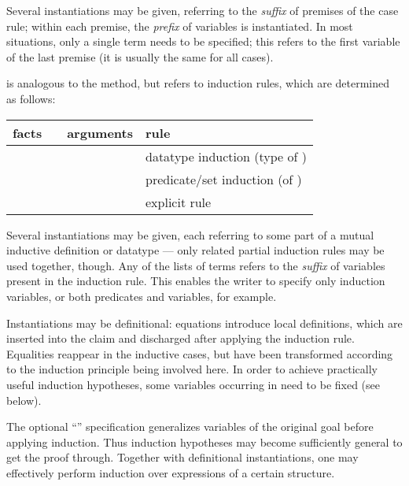\begin{isabellebody}
\begin{isamarkuptext}
\begin{descr}
  Several instantiations may be given, referring to the \emph{suffix}
  of premises of the case rule; within each premise, the \emph{prefix}
  of variables is instantiated.  In most situations, only a single
  term needs to be specified; this refers to the first variable of the
  last premise (it is usually the same for all cases).

  \item [\mbox{\isa{induct}}~\isa{insts\ R}] is analogous to the
  \mbox{} method, but refers to induction rules, which are
  determined as follows:

  \medskip
  \begin{tabular}{llll}
    facts           &                  & arguments            & rule \\\hline
                    & \mbox{\isa{induct}} & \isa{P\ x}        & datatype induction (type of \isa{x}) \\
    \isa{{\isasymturnstile}\ A\ x} & \mbox{\isa{induct}} & \isa{{\isasymdots}}          & predicate/set induction (of \isa{A}) \\
    \isa{{\isasymdots}}     & \mbox{\isa{induct}} & \isa{{\isasymdots}\ rule{\isacharcolon}\ R} & explicit rule \isa{R} \\
  \end{tabular}
  \medskip
  
  Several instantiations may be given, each referring to some part of
  a mutual inductive definition or datatype --- only related partial
  induction rules may be used together, though.  Any of the lists of
  terms  refers to the \emph{suffix} of variables
  present in the induction rule.  This enables the writer to specify
  only induction variables, or both predicates and variables, for
  example.
  
  Instantiations may be definitional: equations 
  introduce local definitions, which are inserted into the claim and
  discharged after applying the induction rule.  Equalities reappear
  in the inductive cases, but have been transformed according to the
  induction principle being involved here.  In order to achieve
  practically useful induction hypotheses, some variables occurring in
   need to be fixed (see below).
  
  The optional ``''
  specification generalizes variables  of the original goal before applying induction.  Thus
  induction hypotheses may become sufficiently general to get the
  proof through.  Together with definitional instantiations, one may
  effectively perform induction over expressions of a certain
  structure.
  

\end{descr}
\end{isamarkuptext}
\end{isabellebody}
